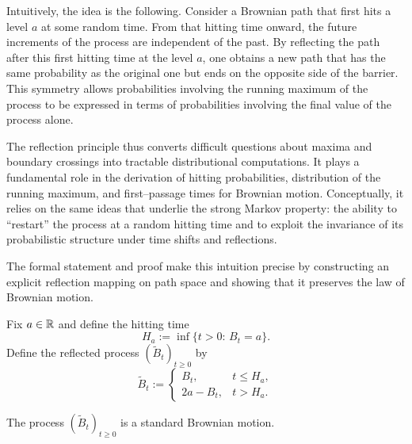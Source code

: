 Intuitively, the idea is the following. Consider a Brownian path that first hits a level
$a$ at some random time. From that hitting time onward, the future increments of the
process are independent of the past. By reflecting the path after this first hitting time
at the level $a$, one obtains a new path that has the same probability as the original one
but ends on the opposite side of the barrier. This symmetry allows probabilities involving
the running maximum of the process to be expressed in terms of probabilities involving
the final value of the process alone.

The reflection principle thus converts difficult questions about maxima and boundary
crossings into tractable distributional computations. It plays a fundamental role in the
derivation of hitting probabilities, distribution of the running maximum, and first--passage
times for Brownian motion. Conceptually, it relies on the same ideas that underlie the
strong Markov property: the ability to ``restart'' the process at a random hitting time
and to exploit the invariance of its probabilistic structure under time shifts and
reflections.

The formal statement and proof make this intuition precise by constructing an explicit
reflection mapping on path space and showing that it preserves the law of Brownian motion.

Fix $a\in\mathbb{R}$ and define the hitting time
\[
H_a:=\inf\{t>0:\,B_t=a\}.
\]
Define the reflected process $(\widetilde B_t)_{t\ge0}$ by
\[
\widetilde B_t:=
\begin{cases}
B_t, & t\le H_a,\\[1mm]
2a-B_t, & t>H_a.
\end{cases}
\]

\begin{theorem}
The process $(\widetilde B_t)_{t\ge0}$ is a standard Brownian motion.
\end{theorem}

